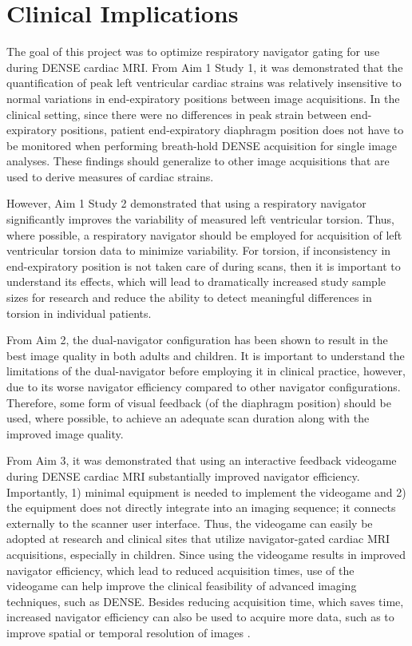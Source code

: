 \section{Clinical Implications}
	The goal of this project was to optimize respiratory navigator gating for use during DENSE cardiac MRI. From Aim 1 Study 1, it was demonstrated that the quantification of peak left ventricular cardiac strains was relatively insensitive to normal variations in end-expiratory positions between image acquisitions. In the clinical setting, since there were no differences in peak strain between end-expiratory positions, patient end-expiratory diaphragm position does not have to be monitored when performing breath-hold DENSE acquisition for single image analyses. These findings should generalize to other image acquisitions that are used to derive measures of cardiac strains.

	However, Aim 1 Study 2 demonstrated that using a respiratory navigator significantly improves the variability of measured left ventricular torsion. Thus, where possible, a respiratory navigator should be employed for acquisition of left ventricular torsion data to minimize variability. For torsion, if inconsistency in end-expiratory position is not taken care of during scans, then it is important to understand its effects, which will lead to dramatically increased study sample sizes for research and reduce the ability to detect meaningful differences in torsion in individual patients.

	From Aim 2, the dual-navigator configuration has been shown to result in the best image quality in both adults and children. It is important to understand the limitations of the dual-navigator before employing it in clinical practice, however, due to its worse navigator efficiency compared to other navigator configurations. Therefore, some form of visual feedback (of the diaphragm position) should be used, where possible, to achieve an adequate scan duration along with the improved image quality.

	From Aim 3, it was demonstrated that using an interactive feedback videogame during DENSE cardiac MRI substantially improved navigator efficiency. Importantly, 1) minimal equipment is needed to implement the videogame and 2) the equipment does not directly integrate into an imaging sequence; it connects externally to the scanner user interface. Thus, the videogame can easily be adopted at research and clinical sites that utilize navigator-gated cardiac MRI acquisitions, especially in children. Since using the videogame results in improved navigator efficiency, which lead to reduced acquisition times, use of the videogame can help improve the clinical feasibility of advanced imaging techniques, such as DENSE. Besides reducing acquisition time, which saves time, increased navigator efficiency can also be used to acquire more data, such as to improve spatial or temporal resolution of images \cite{Feuerlein2009}. 


